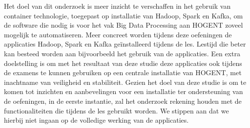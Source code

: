 Het doel van dit onderzoek is meer inzicht te verschaffen in het gebruik van container technologie, toegepast op installatie van Hadoop, Spark en Kafka, om de software die nodig is voor het vak Big Data Processing aan HOGENT zoveel mogelijk te automatiseren.
\newline
Meer concreet worden tijdens deze oefeningen de applicaties Hadoop, Spark en Kafka geïnstalleerd tijdens de les. Lestijd die beter kan besteed worden aan bijvoorbeeld het gebruik van de applicaties.
\newline
\newline
Een extra doelstelling is om met het resultaat van deze studie deze applicaties ook tijdens de examens te kunnen gebruiken op een centrale installatie van HOGENT, met inachtname van veiligheid en stabiliteit.
\newline
\newline
Gezien het doel van deze studie is om te komen tot inzichten en aanbevelingen voor een installatie ter ondersteuning van de oefeningen, in de eerste instantie, zal het onderzoek rekening houden met de functionaliteiten die tijdens de les gebruikt worden. We stippen aan dat we hierbij niet ingaan op de volledige werking van de applicaties.
\newline
\newline

